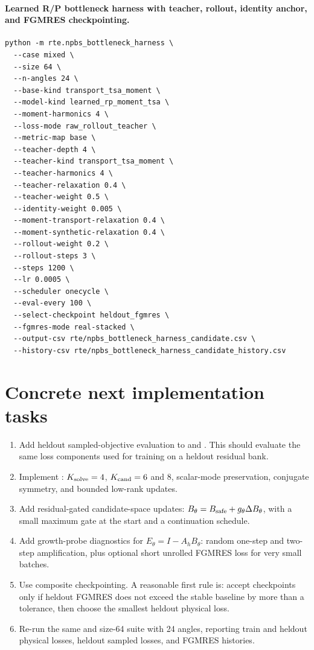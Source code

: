 \documentclass[11pt]{article}
\newcommand{\code}[1]{\texttt{\detokenize{#1}}}
\newcommand{\Ah}{A_h}
\begin{document}
\paragraph{Learned R/P bottleneck harness with teacher, rollout, identity anchor,
and FGMRES checkpointing.}
\begin{verbatim}
python -m rte.npbs_bottleneck_harness \
  --case mixed \
  --size 64 \
  --n-angles 24 \
  --base-kind transport_tsa_moment \
  --model-kind learned_rp_moment_tsa \
  --moment-harmonics 4 \
  --loss-mode raw_rollout_teacher \
  --metric-map base \
  --teacher-depth 4 \
  --teacher-kind transport_tsa_moment \
  --teacher-harmonics 4 \
  --teacher-relaxation 0.4 \
  --teacher-weight 0.5 \
  --identity-weight 0.005 \
  --moment-transport-relaxation 0.4 \
  --moment-synthetic-relaxation 0.4 \
  --rollout-weight 0.2 \
  --rollout-steps 3 \
  --steps 1200 \
  --lr 0.0005 \
  --scheduler onecycle \
  --eval-every 100 \
  --select-checkpoint heldout_fgmres \
  --fgmres-mode real-stacked \
  --output-csv rte/npbs_bottleneck_harness_candidate.csv \
  --history-csv rte/npbs_bottleneck_harness_candidate_history.csv
\end{verbatim}

\section{Concrete next implementation tasks}

\begin{enumerate}
  \item Add heldout sampled-objective evaluation to
   and .
  This should evaluate the same loss components used for training on a heldout
  residual bank.

  \item Implement \code{CandidateRP-TSA}: \(K_{\rm solve}=4\),
  \(K_{\rm cand}=6\) and \(8\), scalar-mode preservation, conjugate symmetry,
  and bounded low-rank updates.

  \item Add residual-gated candidate-space updates:
  \(B_\theta=B_{\rm safe}+g_\theta\Delta B_\theta\), with a small maximum gate
  at the start and a continuation schedule.

  \item Add growth-probe diagnostics for \(E_\theta=I-\Ah B_\theta\):
  random one-step and two-step amplification, plus optional short unrolled
  FGMRES loss for very small batches.

  \item Use composite checkpointing.  A reasonable first rule is:
  accept checkpoints only if heldout FGMRES does not exceed the stable baseline
  by more than a tolerance, then choose the smallest heldout physical loss.

  \item Re-run the same \code{anisotropic} and \code{mixed} size-64 suite with
  24 angles, reporting train and heldout physical losses, heldout sampled
  losses, and FGMRES histories.
\end{enumerate}
\end{document}
